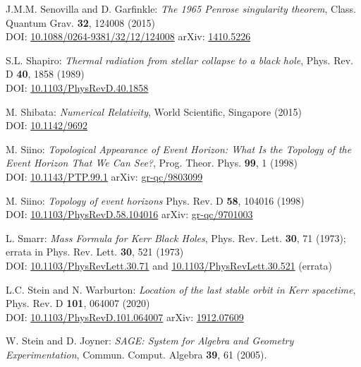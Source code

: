 \begin{thebibliography}{123}
J.M.M. Senovilla and D. Garfinkle:
{\em The 1965 Penrose singularity theorem},
Class. Quantum Grav. {\bf 32}, 124008 (2015)\\
DOI: \href{https://doi.org/10.1088/0264-9381/32/12/124008}{10.1088/0264-9381/32/12/124008}\hfill
arXiv: \href{https://arxiv.org/abs/1410.5226}{1410.5226}

S.L. Shapiro:
{\em Thermal radiation from stellar collapse to a black hole},
Phys. Rev. D {\bf 40}, 1858 (1989)\\
DOI: \href{https://doi.org/10.1103/PhysRevD.40.1858}{10.1103/PhysRevD.40.1858}

M. Shibata:
{\em Numerical Relativity},
World Scientific, Singapore (2015)\\
DOI: \href{https://doi.org/10.1142/9692}{10.1142/9692}

M. Siino: {\em Topological Appearance of Event Horizon:
What Is the Topology of the Event Horizon That We Can See?},
Prog. Theor. Phys. {\bf 99}, 1 (1998)\\
DOI: \href{https://doi.org/10.1143/PTP.99.1}{10.1143/PTP.99.1}\hfill
arXiv: \href{https://arxiv.org/abs/gr-qc/9803099}{gr-qc/9803099}

M. Siino: {\em Topology of event horizons}
Phys. Rev. D {\bf 58}, 104016 (1998)\\
DOI: \href{https://doi.org/10.1103/PhysRevD.58.104016}{10.1103/PhysRevD.58.104016}\hfill
arXiv: \href{https://arxiv.org/abs/gr-qc/9701003}{gr-qc/9701003}

L. Smarr: {\em Mass Formula for Kerr Black Holes},
Phys. Rev. Lett. {\bf 30}, 71 (1973); errata in Phys. Rev. Lett. {\bf 30}, 521 (1973)\\
DOI: \href{https://doi.org/10.1103/PhysRevLett.30.71}{10.1103/PhysRevLett.30.71}
and
\href{https://doi.org/10.1103/PhysRevLett.30.521}{10.1103/PhysRevLett.30.521} (errata)

L.C. Stein and N. Warburton:
{\em Location of the last stable orbit in Kerr spacetime},
Phys. Rev. D  {\bf 101}, 064007 (2020)\\
DOI: \href{https://doi.org/10.1103/PhysRevD.101.064007}{10.1103/PhysRevD.101.064007}\hfill
arXiv: \href{https://arxiv.org/abs/1912.07609}{1912.07609}

W. Stein and D. Joyner:
{\em SAGE: System for Algebra and Geometry Experimentation},
Commun. Comput. Algebra {\bf 39}, 61 (2005).


\end{thebibliography}
